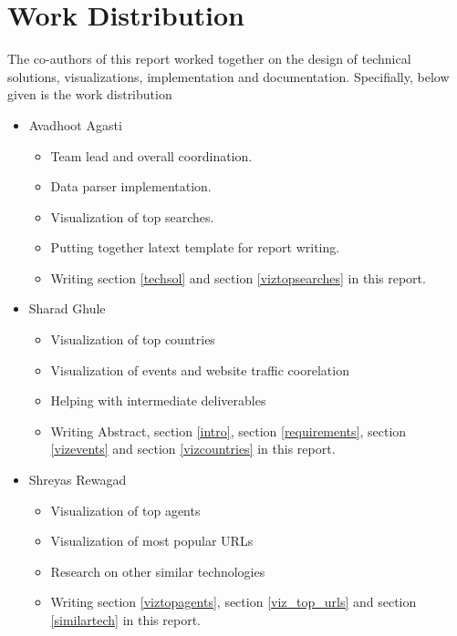 \documentclass[sigconf]{acmart}
\begin{document}









\appendix
\section{Work Distribution}
The co-authors of this report worked together on the design of technical
solutions, visualizations, implementation and documentation. Specifially,
below given is the work distribution
\begin{itemize}
\item Avadhoot Agasti
    \begin{itemize}
    \item Team lead and overall coordination.
    \item Data parser implementation.
    \item Visualization of top searches.
    \item Putting together latext template for report writing.
    \item Writing section \ref{techsol} and section \ref{viztopsearches}
     in this
    report.
    \end{itemize}

\item Sharad Ghule
    \begin{itemize}
    \item Visualization of top countries
    \item Visualization of events and website traffic coorelation
    \item Helping with intermediate deliverables
    \item Writing Abstract, section \ref{intro}, section \ref{requirements},
    section \ref{vizevents} and
    section \ref{vizcountries}  in this report.
    \end{itemize}

\item Shreyas Rewagad
    \begin{itemize}
    \item Visualization of top agents
    \item Visualization of most popular URLs
    \item Research on other similar technologies
    \item Writing section \ref{viztopagents}, section \ref{viz_top_urls} and
    section \ref{similartech}  in this report.
    \end{itemize}


\end{itemize}
\end{document}
